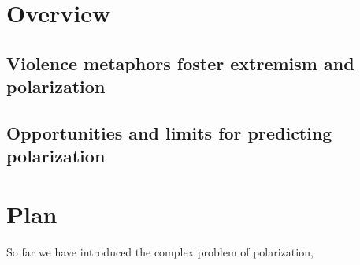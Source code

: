 \documentclass[12pt,letterpaper]{article}
\begin{document}
\section{Overview}

\subsection{Violence metaphors foster extremism and polarization}


\subsection{Opportunities and limits for predicting polarization}

\section{Plan}

So far we have introduced the complex problem of polarization, 



\setlength{\bibleftmargin}{.125in}
\setlength{\bibindent}{-\bibleftmargin}


\end{document}
